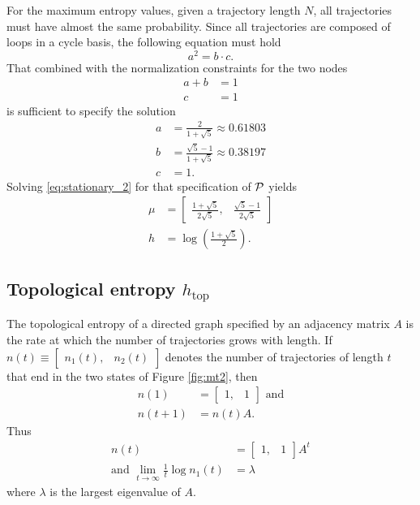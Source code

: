 \documentclass[12pt]{article} \usepackage{amsmath,amsfonts}
\newcommand{\htop}{{h_{\text{top}}}}
\newcommand{\T}{{\cal P}}
\begin{document}
For the maximum entropy values, given a trajectory length $N$, all
trajectories must have almost the same probability.  Since all
trajectories are composed of loops in a cycle basis, the following
equation must hold
\begin{equation}
  \label{eq:excycle}
  a^2 = b\cdot c.
\end{equation}
That combined with the normalization constraints for the two nodes
\begin{align*}
  a + b &= 1 \\
  c &= 1
\end{align*}
is sufficient to specify the solution
\begin{align*}
  a &= \frac{2}{1+\sqrt{5}} \approx          0.61803\\
  b &= \frac{\sqrt{5}-1}{1+\sqrt{5}} \approx 0.38197\\
  c &= 1.
\end{align*}
Solving \eqref{eq:stationary_2} for that specification of $\T$ yields
\begin{align*}
  \mu &=  \begin{bmatrix} \frac{1+\sqrt{5}}{2\sqrt{5}}, &
    \frac{\sqrt{5}-1}{2\sqrt{5}} \end{bmatrix} \\
  h &= \log\left(\frac{1+\sqrt{5}}{2}\right).
\end{align*}


\subsection{Topological entropy $\htop$}
\label{sec:htop}

The topological entropy of a directed graph specified by an adjacency
matrix $A$ is the rate at which the number of trajectories grows with
length.  If $n(t)\equiv\begin{bmatrix} n_1(t),&n_2(t)\end{bmatrix}$
denotes the number of trajectories of length $t$ that end in the two
states of Figure \ref{fig:mt2}, then
\begin{align*}
  n(1) &= \begin{bmatrix} 1,&1\end{bmatrix} \text{ and} \\
  n(t+1) &= n(t) A.
\end{align*}
Thus
\begin{align*}
  n(t) &= \begin{bmatrix} 1,&1\end{bmatrix} A^t \\
  \text{and }\lim_{t\rightarrow \infty} \frac{1}{t} \log n_1(t) &=
  \lambda
\end{align*}
where $\lambda$ is the largest eigenvalue of $A$.
\end{document}
